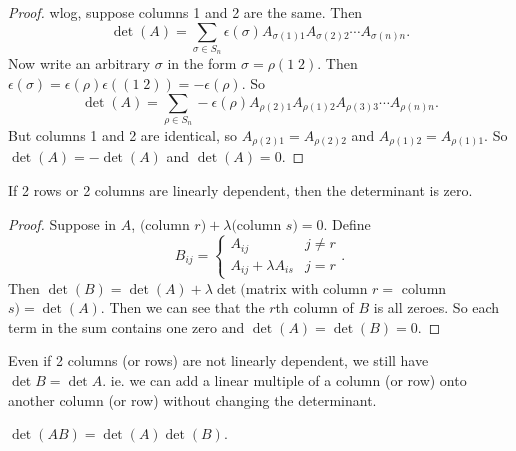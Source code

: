 \documentclass[a4paper]{article}
\begin{document}
\begin{proof}
  wlog, suppose columns 1 and 2 are the same. Then
  \[
    \det (A) = \sum_{\sigma\in S_n} \epsilon(\sigma) A_{\sigma(1)1}A_{\sigma(2)2}\cdots A_{\sigma(n)n}.
  \]
  Now write an arbitrary $\sigma$ in the form $\sigma = \rho(1\; 2)$. Then $\epsilon(\sigma) = \epsilon(\rho)\epsilon((1\; 2)) = -\epsilon(\rho)$. So
  \[
    \det (A) = \sum_{\rho\in S_n} -\epsilon(\rho) A_{\rho(2)1}A_{\rho(1)2}A_{\rho(3)3}\cdots A_{\rho(n)n}.
  \]
  But columns 1 and 2 are identical, so $A_{\rho(2)1} = A_{\rho(2)2}$ and $A_{\rho(1)2} = A_{\rho(1)1}$. So $\det (A) = -\det (A)$ and $\det(A) = 0$.
\end{proof}

\begin{prop}
  If 2 rows or 2 columns are linearly dependent, then the determinant is zero.
\end{prop}

\begin{proof}
  Suppose in $A$, $($column $r) + \lambda($column $s) = 0$. Define
  \[
    B_{ij} =
    \begin{cases}
      A_{ij} & j\not= r\\
      A_{ij} + \lambda A_{is} & j = r
    \end{cases}.
  \]
  Then $\det (B) = \det(A) + \lambda \det($matrix with column $r =$ column $s) = \det(A)$. Then we can see that the $r$th column of $B$ is all zeroes. So each term in the sum contains one zero and $\det (A) = \det (B) = 0$.
\end{proof}
\note Even if 2 columns (or rows) are not linearly dependent, we still have $\det B = \det A$. ie. we can add a linear multiple of a column (or row) onto another column (or row) without changing the determinant.

\begin{prop}
  $\det(AB) = \det(A)\det(B)$.
\end{prop}
\end{document}
